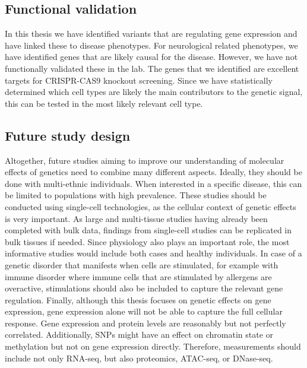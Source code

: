 \subsection{Functional validation}

In this thesis we have identified variants that are regulating gene expression and have linked these to disease phenotypes. For neurological related phenotypes, we have identified genes that are likely causal for the disease. However, we have not functionally validated these in the lab. The genes that we identified are excellent targets for CRISPR-CAS9 knockout screening\cite{agrotisNewAgeFunctional2015}. Since we have statistically determined which cell types are likely the main contributors to the genetic signal, this can be tested in the most likely relevant cell type. 

\subsection{Future study design}
Altogether, future studies aiming to improve our understanding of molecular effects of genetics need to combine many different aspects. Ideally, they should be done with multi-ethnic individuals. When interested in a specific disease, this can be limited to populations with high prevalence. These studies should be conducted using single-cell technologies, as the cellular context of genetic effects is very important. As large\cite{vosaUnravelingPolygenicArchitecture2018} and multi-tissue\cite{thegtexconsortiumGTExConsortiumAtlas2020} studies having already been completed with bulk data, findings from single-cell studies can be replicated in bulk tissues if needed. Since physiology also plays an important role, the most informative studies would include both cases and healthy individuals. In case of a genetic disorder that manifests when cells are stimulated, for example with immune disorder where immune cells that are stimulated by allergens are overactive, stimulations should also be included to capture the relevant gene regulation. Finally, although this thesis focuses on genetic effects on gene expression, gene expression alone will not be able to capture the full cellular response. Gene expression and protein levels are reasonably but not perfectly correlated\cite{buccitelliMRNAsProteinsEmerging2020}. Additionally, SNPs might have an effect on chromatin state or methylation but not on gene expression directly. Therefore, measurements should include not only RNA-seq, but also proteomics, ATAC-seq, or DNase-seq. 

